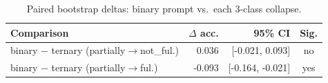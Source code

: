 \begin{table}[htbp]
  \centering
  \caption{Paired bootstrap deltas: binary prompt vs.\ each 3-class collapse.}
  \label{tab:binary-vs-ternary-delta}
  \begin{tabular}{lrrc}
    \toprule
    Comparison & $\Delta$ acc. & 95\% CI & Sig. \\
    \midrule
    binary $-$ ternary (partially$\to$not\_ful.) & 0.036 & [-0.021, 0.093] & no \\
    binary $-$ ternary (partially$\to$ful.) & -0.093 & [-0.164, -0.021] & yes \\
    \bottomrule
  \end{tabular}
\end{table}
